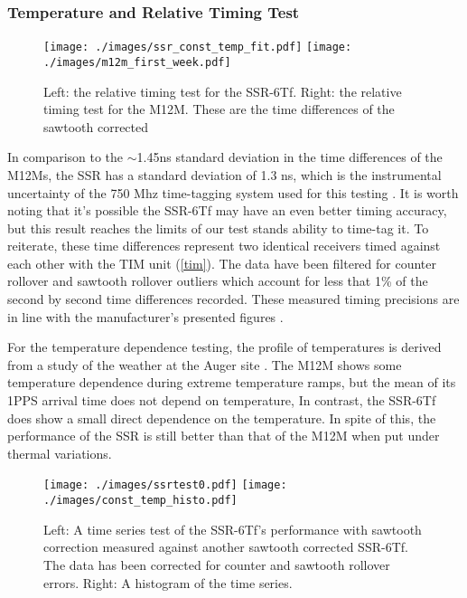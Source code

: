 \subsubsection{Temperature and Relative Timing Test} %


\begin{figure}[H]
\centering
\texttt{[image: ./images/ssr\_const\_temp\_fit.pdf]}
\texttt{[image: ./images/m12m\_first\_week.pdf]}
\caption[SSR-6Tf Relative Timing]{Left: the relative timing test for the SSR-6Tf. Right: the relative timing test for the M12M. These are the time differences of the sawtooth corrected }
\label{relativetimes}
\end{figure}
In comparison to the $\sim$1.45ns standard deviation in the time differences of the
M12Ms, the SSR has a standard deviation of 1.3 ns, which is the
instrumental uncertainty of the 750 Mhz time-tagging system used for
this testing \cite{brandt}. It is worth noting that it's possible the
SSR-6Tf may have an even better timing accuracy, but this result reaches the limits of our test stands ability to time-tag it. To reiterate, these time differences represent two identical receivers timed against each other with the TIM unit (\autoref{tim}). The data have been filtered
for counter rollover and sawtooth rollover outliers which account for
less that 1\% of the second by second time differences recorded. These measured timing precisions are in line with the manufacturer's presented figures \cite{ssr,m12mspec}.

For the temperature dependence testing, the profile of temperatures is
derived from a study of the weather at the Auger site \cite{brandt}. The M12M shows
some temperature dependence during extreme temperature ramps, but the
mean of its 1PPS arrival time does not depend on temperature, In contrast, the
SSR-6Tf does show a small direct dependence on the temperature. In spite of
this, the performance of the SSR is still better than that of the M12M
when put under thermal variations.

\begin{figure}[H]
\centering
\texttt{[image: ./images/ssrtest0.pdf]}
\texttt{[image: ./images/const\_temp\_histo.pdf]}
\caption[SSR-6Tf Relative Timing]{Left: A time series test of the SSR-6Tf's performance with sawtooth correction measured against another sawtooth corrected SSR-6Tf. The data has been corrected for counter and sawtooth rollover errors. Right: A histogram of the time series.}
\label{ssrtest0}
\end{figure}

